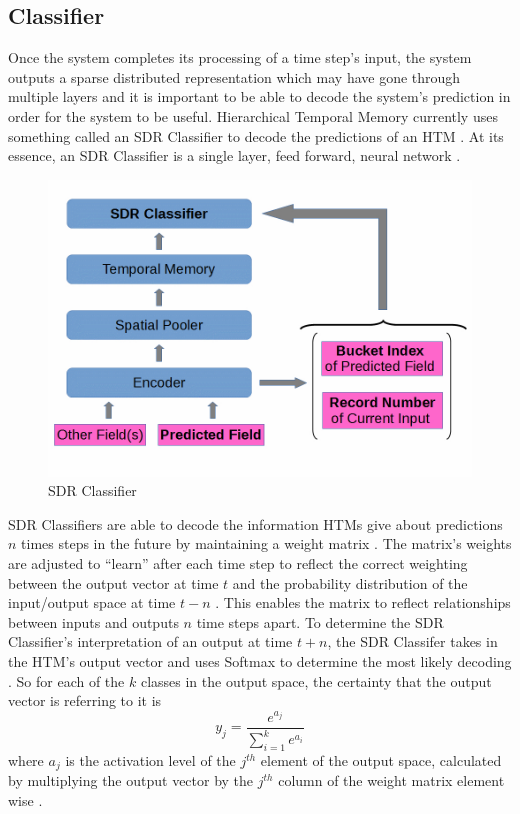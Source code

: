 \documentclass[oneside,12pt,openany]{book}
\begin{document}
	\subsection{Classifier}
	
	Once the system completes its processing of a time step's input, the system outputs a sparse distributed representation which may have gone through multiple layers and it is important to be able to decode the system's prediction in order for the system to be useful. Hierarchical Temporal Memory currently uses something called an SDR Classifier to decode the predictions of an HTM \cite{Dillon}. At its essence, an SDR Classifier is a single layer, feed forward, neural network \cite{Dillon}.
	
	\begin{figure}[h!]
		\centering
		\includegraphics[width=.6\linewidth]{images/SDRClassifier.jpg}
		\caption{SDR Classifier}
		\label{fig 3}
	\end{figure}
	
	SDR Classifiers are able to decode the information HTMs give about predictions $n$ times steps in the future by maintaining a weight matrix \cite{Dillon}. The matrix's weights are adjusted to ``learn'' after each time step to reflect the correct weighting between the output vector at time $t$ and the probability distribution of the input/output space at time $t-n$ \cite{Dillon}. This enables the matrix to reflect relationships between inputs and outputs $n$ time steps apart. To determine the SDR Classifier's interpretation of an output at time $t+n$, the SDR Classifer takes in the HTM's output vector and uses Softmax to determine the most likely decoding \cite{Dillon}. So for each of the $k$ classes in the output space, the certainty that the output vector is referring to it is $$y_{j} = \dfrac{e^{a_{j}}}{\sum_{i=1}^{k} e^{a_{i}}}$$ where $a_{j}$ is the activation level of the $j^{th}$ element of the output space, calculated by multiplying the output vector by the $j^{th}$ column of the weight matrix element wise \cite{Dillon}. 
	
\end{document}
